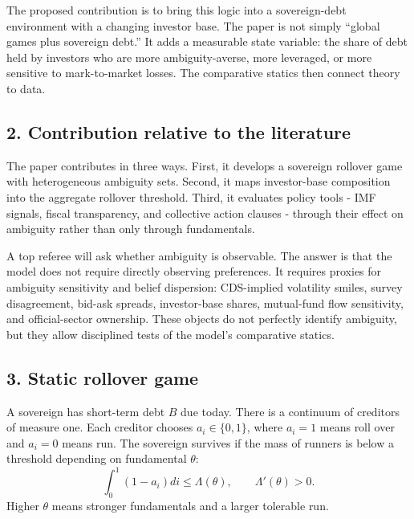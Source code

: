 \documentclass[11pt]{article}
\begin{document}
The proposed contribution is to bring this logic into a sovereign-debt environment with a changing investor base. The paper is not simply ``global games plus sovereign debt.'' It adds a measurable state variable: the share of debt held by investors who are more ambiguity-averse, more leveraged, or more sensitive to mark-to-market losses. The comparative statics then connect theory to data.

\subsection*{2. Contribution relative to the literature}
The paper contributes in three ways. First, it develops a sovereign rollover game with heterogeneous ambiguity sets. Second, it maps investor-base composition into the aggregate rollover threshold. Third, it evaluates policy tools - IMF signals, fiscal transparency, and collective action clauses - through their effect on ambiguity rather than only through fundamentals.

A top referee will ask whether ambiguity is observable. The answer is that the model does not require directly observing preferences. It requires proxies for ambiguity sensitivity and belief dispersion: CDS-implied volatility smiles, survey disagreement, bid-ask spreads, investor-base shares, mutual-fund flow sensitivity, and official-sector ownership. These objects do not perfectly identify ambiguity, but they allow disciplined tests of the model's comparative statics.

\subsection*{3. Static rollover game}
A sovereign has short-term debt $B$ due today. There is a continuum of creditors of measure one. Each creditor chooses $a_i\in\{0,1\}$, where $a_i=1$ means roll over and $a_i=0$ means run. The sovereign survives if the mass of runners is below a threshold depending on fundamental $\theta$:
\begin{equation}
\int_0^1 (1-a_i)di \leq \Lambda(\theta), \qquad \Lambda'(\theta)>0. \label{eq:survival}
\end{equation}
Higher $\theta$ means stronger fundamentals and a larger tolerable run.
\end{document}
